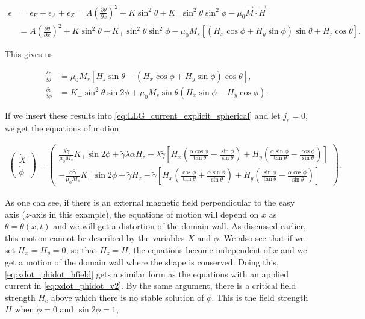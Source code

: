 \documentclass[1p]{elsarticle}		%
\numberwithin{equation}{section}
\begin{document}
\begin{align}
\nonumber \epsilon&=\epsilon_E+\epsilon_A+\epsilon_Z=A (\frac{\partial \theta}{\partial x})^2 + K\sin^2\theta + K_{\perp} \sin^2\theta\sin^2\phi-\mu_0\vec{M}\cdot\vec{H} \\
&= A (\frac{\partial \theta}{\partial x})^2 + K\sin^2\theta + K_{\perp} \sin^2\theta\sin^2\phi-\mu_0M_s\left[(H_x\cos\phi+H_y\sin\phi)\sin\theta+ H_z\cos\theta\right].
\end{align}

This gives us

\begin{align}
\frac{\delta \epsilon}{\delta \theta} &= \mu_0M_s\left[H_z\sin\theta - (H_x\cos\phi+H_y\sin\phi)\cos\theta \right], \\
\frac{\delta \epsilon}{\delta \phi} &= K_{\perp}\sin^2\theta\sin2\phi + \mu_0M_s\sin\theta(H_x\sin\phi-H_y\cos\phi).
\end{align}

If we insert these results into \eqref{eq:LLG_current_explicit_spherical} and let $j_e=0$, we get the equations of motion

\begin{align}
\label{eq:xdot_phidot_hfield}
\begin{pmatrix}
\dot{X} \\ \dot{\phi}
\end{pmatrix} = 
\begin{pmatrix}
\frac{\lambda \tilde{\gamma}}{\mu_0M_s} K_{\perp} \sin2\phi  + \tilde{\gamma}\lambda\alpha H_z - \lambda\tilde{\gamma}\left[H_x(\frac{\alpha\cos\phi}{\tan\theta}-\frac{\sin\phi}{\sin\theta}) + H_y(\frac{\alpha\sin\phi}{\tan\theta}-\frac{\cos\phi}{\sin\theta}) \right] \\
-\frac{\alpha\tilde{\gamma}}{\mu_0M_s} K_{\perp}\sin2\phi + \tilde{\gamma} H_z - \tilde{\gamma}\left[H_x(\frac{\cos\phi}{\tan\theta}+\frac{\alpha\sin\phi}{\sin\theta}) + H_y(\frac{\sin\phi}{\tan\theta}-\frac{\alpha\cos\phi}{\sin\theta}) \right]
\end{pmatrix}.
\end{align}

As one can see, if there is an external magnetic field perpendicular to the easy axis ($z$-axis in this example), the equations of motion will depend on $x$ as $\theta = \theta(x,t)$ and we will get a distortion of the domain wall. As discussed earlier, this motion cannot be described by the variables $X$ and $\phi$. We also see that if we set $H_x = H_y = 0$, so that $H_z = H$, the equations become independent of $x$ and we get a motion of the domain wall where the shape is conserved. Doing this, \eqref{eq:xdot_phidot_hfield} gets a similar form as the equations with an applied current in \eqref{eq:xdot_phidot_v2}. By the same argument, there is a critical field strength $H_c$ above which there is no stable solution of $\phi$. This is the field strength $H$ when $\dot{\phi}=0$ and $\sin2\phi=1$, 
\end{document}
